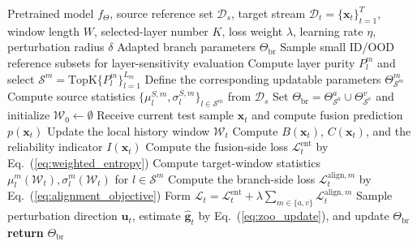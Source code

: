 \begin{algorithm}[t]
\caption{SZOA Online Adaptation}
\label{alg:szoa}
\small
\begin{algorithmic}[1]
\REQUIRE Pretrained model $f_{\Theta}$, source reference set $\mathcal D_s$, target stream $\mathcal D_t=\{\mathbf{x}_t\}_{t=1}^{T}$, window length $W$, selected-layer number $K$, loss weight $\lambda$, learning rate $\eta$, perturbation radius $\delta$
\ENSURE Adapted branch parameters $\Theta_{\mathrm{br}}$
\STATE Sample small ID/OOD reference subsets for layer-sensitivity evaluation
    \STATE Compute layer purity $P_l^m$ and select $\mathcal S^m=\mathrm{TopK}\{P_l^m\}_{l=1}^{L_m}$
    \STATE Define the corresponding updatable parameters $\Theta_{\mathcal S^m}^{m}$
    \STATE Compute source statistics $\{\mu_l^{S,m},\sigma_l^{S,m}\}_{l\in\mathcal S^m}$ from $\mathcal D_s$
\ENDFOR
\STATE Set $\Theta_{\mathrm{br}}=\Theta_{\mathcal S^a}^{a}\cup\Theta_{\mathcal S^v}^{v}$ and initialize $\mathcal W_0\leftarrow\emptyset$
    \STATE Receive current test sample $\mathbf{x}_t$ and compute fusion prediction $p(\mathbf{x}_t)$
    \STATE Update the local history window $\mathcal W_t$
    \STATE Compute $B(\mathbf{x}_t)$, $C(\mathbf{x}_t)$, and the reliability indicator $I(\mathbf{x}_t)$
    \STATE Compute the fusion-side loss $\mathcal L_t^{\mathrm{ent}}$ by Eq.~(\ref{eq:weighted_entropy})
        \STATE Compute target-window statistics $\mu_l^{m}(\mathcal W_t),\sigma_l^{m}(\mathcal W_t)$ for $l\in\mathcal S^m$
        \STATE Compute the branch-side loss $\mathcal L_t^{\mathrm{align},m}$ by Eq.~(\ref{eq:alignment_objective})
    \ENDFOR
    \STATE Form $\mathcal L_t=\mathcal L_t^{\mathrm{ent}}+\lambda\sum_{m\in\{a,v\}}\mathcal L_t^{\mathrm{align},m}$
    \STATE Sample perturbation direction $\mathbf u_t$, estimate $\hat{\mathbf g}_t$ by Eq.~(\ref{eq:zoo_update}), and update $\Theta_{\mathrm{br}}$
\ENDFOR
\STATE \textbf{return} $\Theta_{\mathrm{br}}$
\end{algorithmic}
\end{algorithm}
